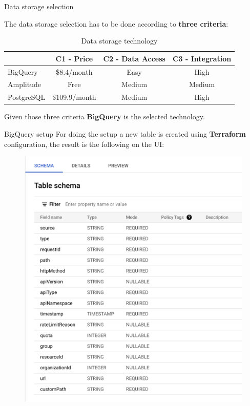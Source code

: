 \documentclass[10pt]{beamer}
\begin{document}
\begin{frame}{Data storage selection}
    
    The data storage selection has to be done according to \textbf{three criteria}:
    
    \begin{table}[h!]
        \centering
        \begin{tabular}{lccc}
            \toprule
           & C1 - Price    & C2 - Data Access & C3 - Integration \\ \midrule
BigQuery   & \$8.4/month   & Easy             & High \\
Amplitude  & Free          & Medium           & Medium  \\
PostgreSQL & \$109.9/month & Medium           & High  \\                \bottomrule
        \end{tabular}
\caption{Data storage technology}
        \label{tab:data-souces}
    \end{table}
    
    \centering
    Given those three criteria \textbf{BigQuery} is the selected technology.
\end{frame}

\begin{frame}{BigQuery setup}
    For doing the setup a new table is created using \textbf{Terraform} configuration, the result is the following on the UI:
    
    \begin{figure}
        \centering
        \includegraphics[scale=0.25]{src/thesis/img/technical-solution/bigquery-schema.png}
        \label{fig:my_label}
    \end{figure}
\end{frame}
\end{document}
